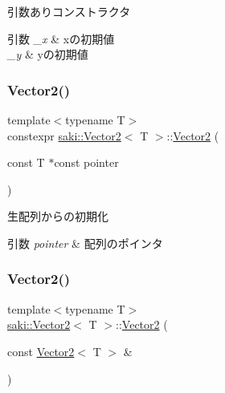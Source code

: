 引数ありコンストラクタ 


\begin{DoxyParams}{引数}
{\em \+\_\+x} & xの初期値 \\
\hline
{\em \+\_\+y} & yの初期値 \\
\hline
\end{DoxyParams}
\mbox{\label{classsaki_1_1_vector2_ad2c0fd66544f68066179490647244b14}} 
\subsubsection{\texorpdfstring{Vector2()}{Vector2()}\hspace{0.1cm}{\footnotesize\ttfamily [3/5]}}
{\footnotesize\ttfamily template$<$typename T$>$ \\
constexpr \mbox{\hyperlink{classsaki_1_1_vector2}{saki\+::\+Vector2}}$<$ T $>$\+::\mbox{\hyperlink{classsaki_1_1_vector2}{Vector2}} (\begin{DoxyParamCaption}\item[{const T $\ast$const}]{pointer }\end{DoxyParamCaption})\hspace{0.3cm}{\ttfamily [inline]}}



生配列からの初期化 


\begin{DoxyParams}{引数}
{\em pointer} & 配列のポインタ \\
\hline
\end{DoxyParams}
\mbox{\label{classsaki_1_1_vector2_af3d61bb90047a8621cba0a17b265bfaa}} 
\subsubsection{\texorpdfstring{Vector2()}{Vector2()}\hspace{0.1cm}{\footnotesize\ttfamily [4/5]}}
{\footnotesize\ttfamily template$<$typename T$>$ \\
\mbox{\hyperlink{classsaki_1_1_vector2}{saki\+::\+Vector2}}$<$ T $>$\+::\mbox{\hyperlink{classsaki_1_1_vector2}{Vector2}} (\begin{DoxyParamCaption}\item[{const \mbox{\hyperlink{classsaki_1_1_vector2}{Vector2}}$<$ T $>$ \&}]{ }\end{DoxyParamCaption})\hspace{0.3cm}{\ttfamily [default]}}

